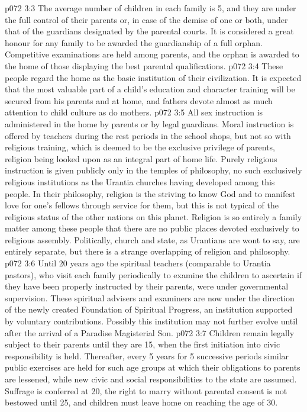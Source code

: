 \vs p072 3:3 The average number of children in each family is 5, and they are under the full control of their parents or, in case of the demise of one or both, under that of the guardians designated by the parental courts. It is considered a great honour for any family to be awarded the guardianship of a full orphan. Competitive examinations are held among parents, and the orphan is awarded to the home of those displaying the best parental qualifications.
\vs p072 3:4 \pc These people regard the home as the basic institution of their civilization. It is expected that the most valuable part of a child’s education and character training will be secured from his parents and at home, and fathers devote almost as much attention to child culture as do mothers.
\vs p072 3:5 All sex instruction is administered in the home by parents or by legal guardians. Moral instruction is offered by teachers during the rest periods in the school shops, but not so with religious training, which is deemed to be the exclusive privilege of parents, religion being looked upon as an integral part of home life. Purely religious instruction is given publicly only in the temples of philosophy, no such exclusively religious institutions as the Urantia churches having developed among this people. In their philosophy, religion is the striving to know God and to manifest love for one’s fellows through service for them, but this is not typical of the religious status of the other nations on this planet. Religion is so entirely a family matter among these people that there are no public places devoted exclusively to religious assembly. Politically, church and state, as Urantians are wont to say, are entirely separate, but there is a strange overlapping of religion and philosophy.
\vs p072 3:6 Until 20 years ago the spiritual teachers (comparable to Urantia pastors), who visit each family periodically to examine the children to ascertain if they have been properly instructed by their parents, were under governmental supervision. These spiritual advisers and examiners are now under the direction of the newly created Foundation of Spiritual Progress, an institution supported by voluntary contributions. Possibly this institution may not further evolve until after the arrival of a Paradise Magisterial Son.
\vs p072 3:7 \pc Children remain legally subject to their parents until they are 15, when the first initiation into civic responsibility is held. Thereafter, every 5 years for 5 successive periods similar public exercises are held for such age groups at which their obligations to parents are lessened, while new civic and social responsibilities to the state are assumed. Suffrage is conferred at 20, the right to marry without parental consent is not bestowed until 25, and children must leave home on reaching the age of 30.
